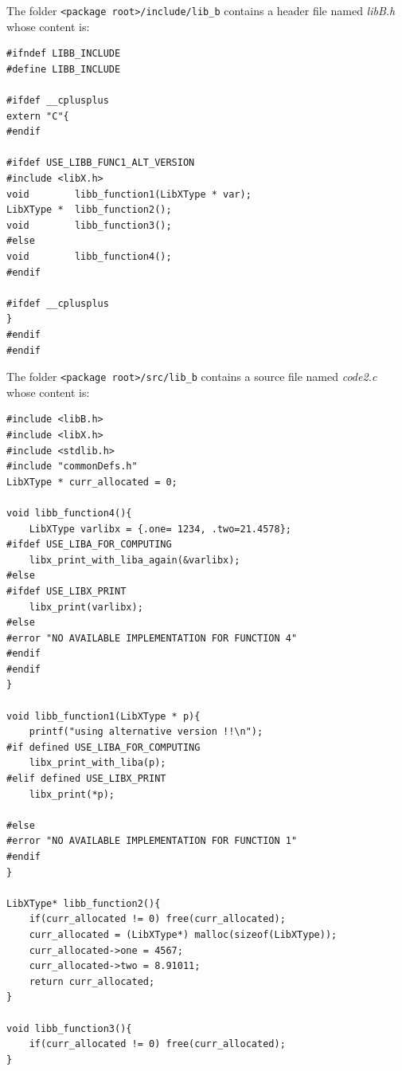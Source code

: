 \documentclass[12pt,a4paper]{article}
\begin{document}
The folder \texttt{<package root>/include/lib\_b} contains a header file named \textit{libB.h} whose content is: 
\begin{verbatim}
#ifndef LIBB_INCLUDE
#define LIBB_INCLUDE

#ifdef __cplusplus
extern "C"{
#endif

#ifdef USE_LIBB_FUNC1_ALT_VERSION
#include <libX.h>
void        libb_function1(LibXType * var);
LibXType *  libb_function2();
void        libb_function3();
#else
void        libb_function4();
#endif

#ifdef __cplusplus
}
#endif
#endif
\end{verbatim}

The folder \texttt{<package root>/src/lib\_b} contains a source file named \textit{code2.c} whose content is: 
\begin{verbatim}
#include <libB.h>
#include <libX.h>
#include <stdlib.h>
#include "commonDefs.h"
LibXType * curr_allocated = 0;

void libb_function4(){
	LibXType varlibx = {.one= 1234, .two=21.4578};
#ifdef USE_LIBA_FOR_COMPUTING
	libx_print_with_liba_again(&varlibx);
#else 
#ifdef USE_LIBX_PRINT
	libx_print(varlibx);
#else
#error "NO AVAILABLE IMPLEMENTATION FOR FUNCTION 4"
#endif
#endif
}

void libb_function1(LibXType * p){
	printf("using alternative version !!\n");
#if defined USE_LIBA_FOR_COMPUTING
	libx_print_with_liba(p);
#elif defined USE_LIBX_PRINT
	libx_print(*p);

#else
#error "NO AVAILABLE IMPLEMENTATION FOR FUNCTION 1"
#endif
}

LibXType* libb_function2(){
	if(curr_allocated != 0) free(curr_allocated);
	curr_allocated = (LibXType*) malloc(sizeof(LibXType));
	curr_allocated->one = 4567;
	curr_allocated->two = 8.91011;
	return curr_allocated;
}

void libb_function3(){
	if(curr_allocated != 0) free(curr_allocated);
}
\end{verbatim}
\end{document}
